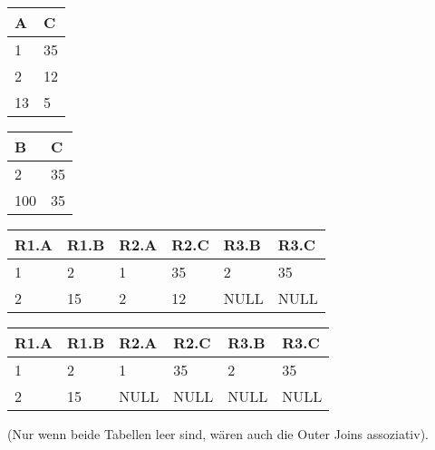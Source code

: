 \documentclass{bschlangaul-aufgabe}
\begin{document}
\begin{enumerate}
\begin{bAntwort}

\begin{tabular}{|l|l|}
\hline
A  & C  \\ \hline
1  & 35 \\ \hline
2  & 12 \\ \hline
13 & 5  \\ \hline
\end{tabular}


\begin{tabular}{|l|l|}
\hline
B   & C  \\ \hline
2   & 35 \\ \hline
100 & 35 \\ \hline
\end{tabular}


\begin{tabular}{|l|l|l|l|l|l|}
\hline
R1.A & R1.B & R2.A & R2.C & R3.B & R3.C \\ \hline
1    & 2    & 1    & 35   & 2    & 35   \\ \hline
2    & 15   & 2    & 12   & NULL & NULL \\ \hline
\end{tabular}


\begin{tabular}{|l|l|l|l|l|l|}
\hline
R1.A & R1.B & R2.A & R2.C & R3.B & R3.C \\ \hline
1    & 2    & 1    & 35   & 2    & 35   \\ \hline
2    & 15   & NULL & NULL & NULL & NULL \\ \hline
\end{tabular}

(Nur wenn beide Tabellen leer sind, wären auch die Outer Joins assoziativ).
\end{bAntwort}
\end{enumerate}
\end{document}
